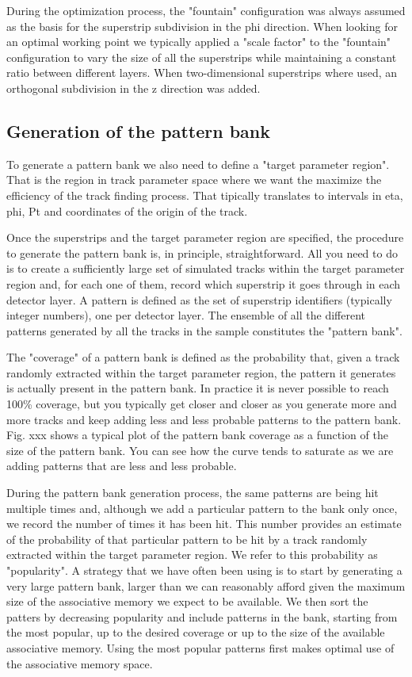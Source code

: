 During the optimization process, the "fountain" configuration was always assumed as the basis for the superstrip subdivision in the phi direction. When looking for an optimal working point we typically applied a "scale factor" to the "fountain" configuration to vary the size of all the superstrips while maintaining a constant ratio between different layers. When two-dimensional superstrips where used, an orthogonal subdivision in the z direction was added. 



\subsection{Generation of the pattern bank}

To generate a pattern bank we also need to define a "target parameter region". That is the region in track parameter space where we want the maximize the efficiency of the track finding process. That tipically translates to intervals in eta, phi, Pt and coordinates of the origin of the track.

Once the superstrips and the target parameter region are specified, the procedure to generate the pattern bank is, in principle, straightforward. All you need to do is to create a sufficiently large set of simulated tracks within the target parameter region and, for each one of them, record which superstrip it goes through in each detector layer. A pattern is defined as the set of superstrip identifiers (typically integer numbers), one per detector layer. The ensemble of all the different patterns generated by all the tracks in the sample constitutes the "pattern bank".

The "coverage" of a pattern bank is defined as the probability that, given a track randomly extracted within the target parameter region, the pattern it generates is actually present in the pattern bank. In practice it is never possible to reach 100\% coverage, but you typically get closer and closer as you generate more and more tracks and keep adding less and less probable patterns to the pattern bank.
Fig. xxx shows a typical plot of the pattern bank coverage as a function of the size of the pattern bank. You can see how the curve tends to saturate as we are adding patterns that are less and less probable.

During the pattern bank generation process, the same patterns are being hit multiple times and, although we add a particular pattern to the bank only once, we record the number of times it has been hit. This number provides an estimate of the probability of that particular pattern to be hit by a track randomly extracted within the target parameter region. We refer to this probability as "popularity".
A strategy that we have often been using is to start by generating a very large pattern bank, larger than we can reasonably afford given the maximum size of the associative memory we expect to be available. We then sort the patters by decreasing popularity and include patterns in the bank, starting from the most popular, up to the desired coverage or up to the size of the available associative memory. Using the most popular patterns first makes optimal use of the associative memory space.

